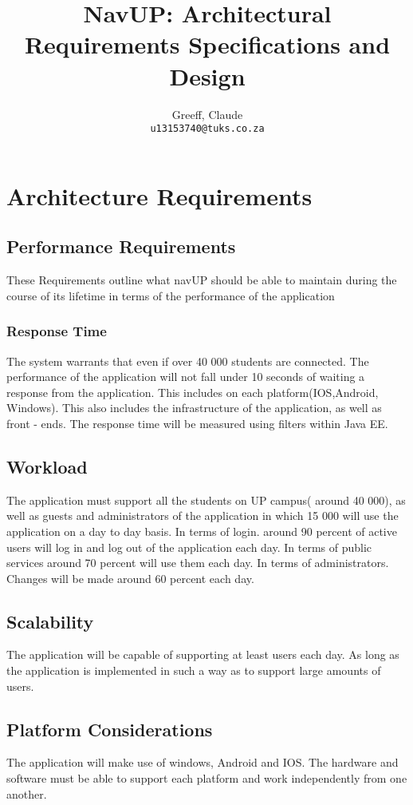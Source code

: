 \documentclass{article}
\title{NavUP: Architectural Requirements Specifications and Design}
\author{	 
	Greeff, Claude\\
	\texttt{u13153740@tuks.co.za}
	\and	
}
\begin{document}
	\maketitle
	\section{Architecture Requirements}
		\subsection{Performance Requirements}
These Requirements outline what navUP should be able to maintain during the course of its lifetime in terms of the performance of the application
		 
		 \subsubsection{Response Time}
		 The system warrants that even if over 40 000 students are connected. The performance of the application will not fall under 10 seconds of waiting a response from the application. This includes on each platform(IOS,Android, Windows). This also includes the infrastructure of the application, as well as front - ends. The response time will be measured using filters within Java EE. 

		\subsection{Workload}
		The application must support all the students on UP campus( around 40 000), as well as guests and administrators of the application in which 15 000 will use the application on a day to day basis.
		In terms of login. around 90 percent of active users will log in and log out of the application each day. In terms of public services around 70 percent will use them each day. In terms of administrators. Changes will be made around 60 percent each day.
		\subsection{Scalability}
The application will be capable of supporting at least users each day. As long as the application is implemented in such a way as to support large amounts of users.
		
		\subsection{Platform Considerations}
		The application will make use of windows, Android and IOS. The hardware and software must be able to support each platform and work independently from one another.
		


 		
	
\end{document}
